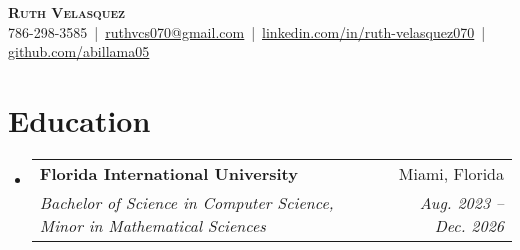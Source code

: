 \documentclass[letterpaper,11pt]{article}
\makeatletter
\newcommand{\resumeSubheading}[4]{
  \vspace{-2pt}\item
    \begin{tabular*}{0.97\textwidth}[t]{l@{\extracolsep{\fill}}r}
      \textbf{#1} & #2 \\
      \textit{\small#3} & \textit{\small #4} \\
    \end{tabular*}\vspace{-7pt}
}
\newcommand{\resumeSubHeadingListStart}{\begin{itemize}[leftmargin=0.15in, label={}]}
\newcommand{\resumeSubHeadingListEnd}{\end{itemize}}
\makeatother
\begin{document}

\begin{center}
    \textbf{\Huge \scshape Ruth Velasquez} \\ \vspace{1pt}
    \small 
    786-298-3585 \,|\, 
    \href{mailto:ruthvcs070@gmail.com}{\underline{ruthvcs070@gmail.com}} \,|\,
    \href{https://www.linkedin.com/in/ruth-velasquez070/}{\underline{linkedin.com/in/ruth-velasquez070}} \,|\,
    \href{https://github.com/abillama05}{\underline{github.com/abillama05}}
\end{center}



\section{Education}
  \resumeSubHeadingListStart
    \resumeSubheading
      {Florida International University}{Miami, Florida}
      {Bachelor of Science in Computer Science, Minor in Mathematical Sciences}{Aug. 2023 -- Dec. 2026}
  \resumeSubHeadingListEnd


\end{document}
